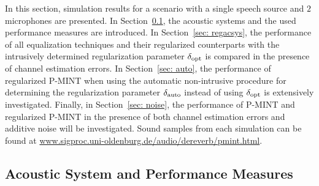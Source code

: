 \documentclass[10pt]{IEEEtran}
\begin{document}
In this section, simulation results for a scenario with a single speech source and $2$ microphones are presented.
In Section~\ref{sec: acsys}, the acoustic systems and the used performance measures are introduced.
In Section~\ref{sec: regacsys}, the performance of all equalization techniques and their regularized counterparts with the intrusively determined regularization parameter $\delta_{\rm opt}$ is compared in the presence of channel estimation errors.
In Section~\ref{sec: auto}, the performance of regularized P-MINT when using the automatic non-intrusive procedure for determining the regularization parameter $\delta_{\rm auto}$ instead of using $\delta_{\rm opt}$ is extensively investigated.
Finally, in Section~\ref{sec: noise}, the performance of P-MINT and regularized P-MINT in the presence of both channel estimation errors and additive noise will be investigated.
Sound samples from each simulation can be found at {\small \url{www.sigproc.uni-oldenburg.de/audio/dereverb/pmint.html}}.

\subsection{Acoustic System and Performance Measures}
\label{sec: acsys}
\end{document}
